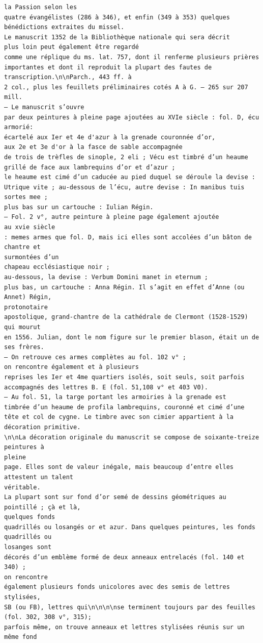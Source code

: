 \documentclass[a4paper,12pt,twoside]{book}
\begin{document}
\begin{verbatim}
la Passion selon les 
quatre évangélistes (286 à 346), et enfin (349 à 353) quelques
bénédictions extraites du missel.
Le manuscrit 1352 de la Bibliothèque nationale qui sera décrit 
plus loin peut également être regardé 
comme une réplique du ms. lat. 757, dont il renferme plusieurs prières 
importantes et dont il reproduit la plupart des fautes de 
transcription.\n\nParch., 443 ff. à 
2 col., plus les feuillets préliminaires cotés A à G. — 265 sur 207 mill. 
— Le manuscrit s’ouvre
par deux peintures à pleine page ajoutées au XVIe siècle : fol. D, écu armorié:
écartelé aux Ier et 4e d'azur à la grenade couronnée d’or, 
aux 2e et 3e d'or à la fasce de sable accompagnée
de trois de trèfles de sinople, 2 eli ; Vécu est timbré d’un heaume 
grillé de face aux lambrequins d’or et d’azur ; 
le heaume est cimé d’un caducée au pied duquel se déroule la devise :
Utrique vite ; au-dessous de l’écu, autre devise : In manibus tuis sortes mee ;
plus bas sur un cartouche : Iulian Régin. 
— Fol. 2 v°, autre peinture à pleine page également ajoutée
au xvie siècle
: memes armes que fol. D, mais ici elles sont accolées d’un bâton de chantre et 
surmontées d’un
chapeau ecclésiastique noir ; 
au-dessous, la devise : Verbum Domini manet in eternum ;
plus bas, un cartouche : Anna Régin. Il s’agit en effet d’Anne (ou Annet) Régin, 
protonotaire 
apostolique, grand-chantre de la cathédrale de Clermont (1528-1529) qui mourut
en 1556. Julian, dont le nom figure sur le premier blason, était un de ses frères.
— On retrouve ces armes complètes au fol. 102 v° ; 
on rencontre également et à plusieurs 
reprises les Ier et 4me quartiers isolés, soit seuls, soit parfois 
accompagnés des lettres B. E (fol. 51,108 v° et 403 V0).
— Au fol. 51, la targe portant les armoiries à la grenade est
timbrée d’un heaume de profila lambrequins, couronné et cimé d’une
tête et col de cygne. Le timbre avec son cimier appartient à la décoration primitive.
\n\nLa décoration originale du manuscrit se compose de soixante-treize peintures à
pleine 
page. Elles sont de valeur inégale, mais beaucoup d’entre elles attestent un talent
véritable.
La plupart sont sur fond d’or semé de dessins géométriques au pointillé ; çà et là, 
quelques fonds
quadrillés ou losangés or et azur. Dans quelques peintures, les fonds quadrillés ou 
losanges sont
décorés d’un emblème formé de deux anneaux entrelacés (fol. 140 et 340) ; 
on rencontre 
également plusieurs fonds unicolores avec des semis de lettres stylisées,
SB (ou FB), lettres qui\n\n\n\nse terminent toujours par des feuilles 
(fol. 302, 308 v°, 315);
parfois même, on trouve anneaux et lettres stylisées réunis sur un même fond 

\end{verbatim}
\end{document}

